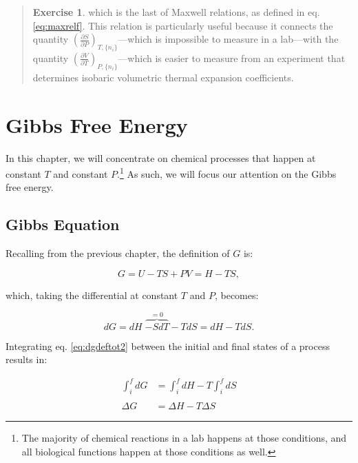 \documentclass[
  9pt,
]{extbook}
\theoremstyle{definition}
\theoremstyle{definition}
\theoremstyle{definition}
\newtheorem{exercise}{Exercise}[chapter]
\theoremstyle{remark}
\begin{document}
\begin{quote}
\begin{exercise}
which is the last of Maxwell relations, as defined in eq. \eqref{eq:maxrelf}. This relation is particularly useful because it connects the quantity \(\left(\frac{\partial S}{\partial P} \right)_{T,\{n_i\}}\)---which is impossible to measure in a lab---with the quantity \(\left(\frac{\partial V}{\partial T} \right)_{P,\{n_i\}}\)---which is easier to measure from an experiment that determines isobaric volumetric thermal expansion coefficients.
\end{exercise}
\end{quote}

\renewcommand*{\standardstate}{{-\kern-6pt{\ominus}\kern-6pt-}}

\hypertarget{GibbsFree}{%
\chapter{Gibbs Free Energy}\label{GibbsFree}}

In this chapter, we will concentrate on chemical processes that happen at constant \(T\) and constant \(P\).\footnote{The majority of chemical reactions in a lab happens at those conditions, and all biological functions happen at those conditions as well.} As such, we will focus our attention on the Gibbs free energy.

\hypertarget{gibbseqsec}{%
\section{Gibbs Equation}\label{gibbseqsec}}

Recalling from the previous chapter, the definition of \(G\) is:

\begin{equation}
G = U -TS +PV = H-TS,
\label{eq:dgdeftot}
\end{equation}

which, taking the differential at constant \(T\) and \(P\), becomes:

\begin{equation}
dG = dH \; \overbrace{-SdT}^{=0} -TdS = dH -TdS.
\label{eq:dgdeftot2}
\end{equation}

Integrating eq. \eqref{eq:dgdeftot2} between the initial and final states of a process results in:

\begin{equation}
\begin{aligned}
\int_i^f dG &= \int_i^f dH -T \int_i^f dS \\
\\
\Delta G &= \Delta H -T \Delta S
\end{aligned}
\label{eq:gibbseq}
\end{equation}
\end{document}
